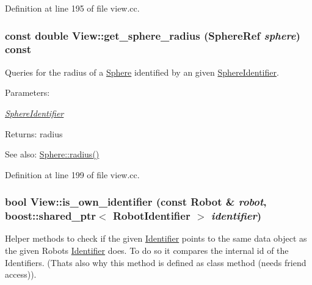 Definition at line 195 of file view.cc.\hypertarget{class_view_b7aa87fa394fbcd9a84e288dd89b36ee}{
\subsubsection[get\_\-sphere\_\-radius]{\setlength{\rightskip}{0pt plus 5cm}const double View::get\_\-sphere\_\-radius (SphereRef {\em sphere}) const}}
\label{class_view_b7aa87fa394fbcd9a84e288dd89b36ee}


Queries for the radius of a \hyperlink{class_sphere}{Sphere} identified by an given \hyperlink{class_sphere_identifier}{SphereIdentifier}. \begin{Desc}
\item[Parameters:]
\begin{description}
\item[{\em \hyperlink{class_sphere_identifier}{SphereIdentifier}}]\end{description}
\end{Desc}
\begin{Desc}
\item[Returns:]radius \end{Desc}
\begin{Desc}
\item[See also:]\hyperlink{class_sphere_82c3e6746f79196c744b46f39569689e}{Sphere::radius()} \end{Desc}


Definition at line 199 of file view.cc.\hypertarget{class_view_72674a687dbcec3e4a58191a65fd1ace}{
\subsubsection[is\_\-own\_\-identifier]{\setlength{\rightskip}{0pt plus 5cm}bool View::is\_\-own\_\-identifier (const Robot \& {\em robot}, \/  boost::shared\_\-ptr$<$ {\bf RobotIdentifier} $>$ {\em identifier})}}
\label{class_view_72674a687dbcec3e4a58191a65fd1ace}


Helper methods to check if the given \hyperlink{class_identifier}{Identifier} points to the same data object as the given Robots \hyperlink{class_identifier}{Identifier} does. To do so it compares the internal id of the Identifiers. (Thats also why this method is defined as class method (needs friend access)). 


